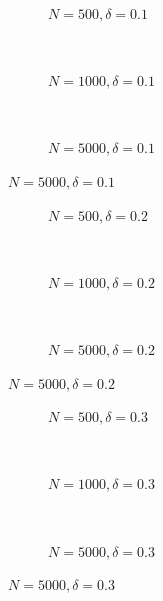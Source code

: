 \documentclass{beamer}
\begin{document}
\begin{frame}
\begin{figure}[h]
  \scriptsize
  \begingroup
  \centering
  \begin{subfigure}[b]{0.31\textwidth}
\caption{\footnotesize $N=500, \delta = 0.1$}
  
  \end{subfigure}
  ~
  \begin{subfigure}[b]{0.31\textwidth}
    \caption{\footnotesize $N=1000, \delta = 0.1$} 
  
  \end{subfigure}
  ~
  \begin{subfigure}[b]{0.31\textwidth}
\caption{\footnotesize $N=5000, \delta = 0.1$}
  
  \end{subfigure}
\endgroup
\end{figure}
\end{frame}
\begin{frame}
\begin{figure}[h]
  \scriptsize
  \begingroup
  \centering
  \begin{subfigure}[b]{0.31\textwidth}
\caption{\footnotesize $N=500, \delta = 0.2$}
  
  \end{subfigure}
  ~
  \begin{subfigure}[b]{0.31\textwidth}
    \caption{\footnotesize $N=1000, \delta = 0.2$} 
  
  \end{subfigure}
  ~
  \begin{subfigure}[b]{0.31\textwidth}
\caption{\footnotesize $N=5000, \delta = 0.2$}
  
  \end{subfigure}
\endgroup
\end{figure}
\end{frame}
\begin{frame}
\begin{figure}[h]
  \scriptsize
  \begingroup
  \centering
  \begin{subfigure}[b]{0.31\textwidth}
\caption{\footnotesize $N=500, \delta = 0.3$}
  
  \end{subfigure}
  ~
  \begin{subfigure}[b]{0.31\textwidth}
    \caption{\footnotesize $N=1000, \delta = 0.3$} 
  
  \end{subfigure}
  ~
  \begin{subfigure}[b]{0.31\textwidth}
\caption{\footnotesize $N=5000, \delta = 0.3$}
  
  \end{subfigure}
\endgroup
\end{figure}
\end{frame}
\end{document}
